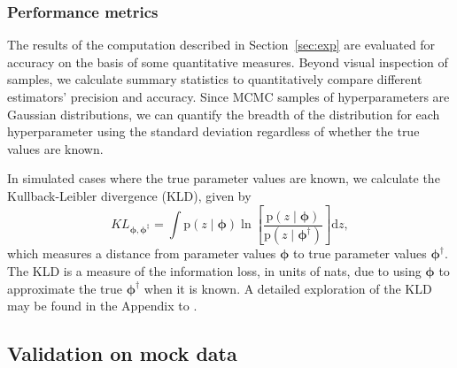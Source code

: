 \documentclass[iop]{emulateapj}
\newcommand{\todo}[3]{{\color{#2}\emph{#1}: #3}}
\newcommand{\aim}[1]{\todo{AIM}{red}{#1}}
\newcommand{\Sect}[1]{Section~\ref{#1}}
\newcommand{\pr}[1]{\ensuremath{\mathrm{p}(#1)}}%
\newcommand{\gvn}{\mid}%
\newcommand{\integral}[2]{\ensuremath{\int #1 \mathrm{d} #2}}
\newcommand{\nz}{$n(z)$}
\newcommand{\bvec}[1]{\ensuremath{\boldsymbol{#1}}}%
\newcommand{\ndphi}{\bvec{\phi}}
\begin{document}
\subsubsection{Performance metrics}
\label{sec:diag}

The results of the computation described in \Sect{sec:exp} are evaluated for accuracy on the basis of some quantitative measures.  
Beyond visual inspection of samples, we calculate summary statistics to quantitatively compare different estimators' precision and accuracy.  
Since MCMC samples of hyperparameters are Gaussian distributions, we can quantify the breadth of the distribution for each hyperparameter using the standard deviation regardless of whether the true values are known.  

In simulated cases where the true parameter values are known, we calculate the Kullback-Leibler divergence (KLD), given by 
\begin{equation}
\label{eqn:kl}
KL_{\ndphi,\ndphi^{\ddagger}} = \integral{\pr{z \gvn \ndphi} \ln \left[ \frac{\pr{z \gvn \ndphi}}{\pr{z \gvn \ndphi^{\dagger}}} \right]}{z} ,
\end{equation}
which measures a distance from parameter values $\ndphi$ to true parameter values $\ndphi^{\dagger}$.  
The KLD is a measure of the information loss, in units of nats, due to using $\ndphi$ to approximate the true $\ndphi^{\dagger}$ when it is known.
A detailed exploration of the KLD may be found in the Appendix to \citet{malz_approximating_2018}.


\subsection{Validation on mock data}
\label{sec:mock}
\end{document}
